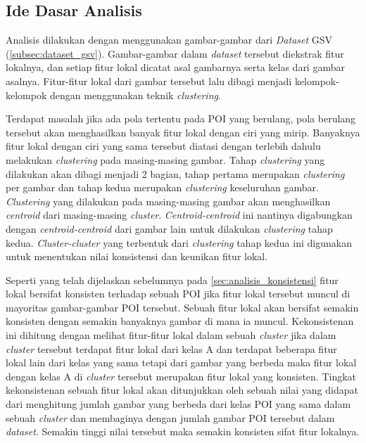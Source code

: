 \subsection{Ide Dasar Analisis}
\label{subsec:ide_analisis_clustering}
Analisis dilakukan dengan menggunakan gambar-gambar dari \textit{Dataset} GSV (\ref{subsec:dataset_gsv}). Gambar-gambar dalam \textit{dataset} tersebut diekstrak fitur lokalnya, dan setiap fitur lokal dicatat asal gambarnya serta kelas dari gambar asalnya. Fitur-fitur lokal dari gambar tersebut lalu dibagi menjadi kelompok-kelompok dengan menggunakan teknik \textit{clustering}.

 Terdapat masalah jika ada pola tertentu pada POI yang berulang, pola berulang tersebut akan menghasilkan banyak fitur lokal dengan ciri yang mirip. Banyaknya fitur lokal dengan ciri yang sama tersebut diatasi dengan terlebih dahulu melakukan \textit{clustering} pada masing-masing gambar. Tahap \textit{clustering} yang dilakukan akan dibagi menjadi 2 bagian, tahap pertama merupakan \textit{clustering} per gambar dan tahap kedua merupakan \textit{clustering} keseluruhan gambar. \textit{Clustering} yang dilakukan pada masing-masing gambar akan menghasilkan \textit{centroid} dari masing-masing \textit{cluster}. \textit{Centroid-centroid} ini nantinya digabungkan dengan \textit{centroid-centroid} dari gambar lain untuk dilakukan \textit{clustering} tahap kedua. \textit{Cluster-cluster} yang terbentuk dari \textit{clustering} tahap kedua ini digunakan untuk menentukan nilai konsistensi dan keunikan fitur lokal. 

Seperti yang telah dijelaskan sebelumnya pada \ref{sec:analisis_konsistensi} fitur lokal bersifat konsisten terhadap sebuah POI jika fitur lokal tersebut muncul di mayoritas gambar-gambar POI tersebut. Sebuah fitur lokal akan bersifat semakin konsisten dengan semakin banyaknya gambar di mana ia muncul. Kekonsistenan ini dihitung dengan melihat fitur-fitur lokal dalam sebuah \textit{cluster} jika dalam \textit{cluster} tersebut terdapat fitur lokal dari kelas A dan terdapat beberapa fitur lokal lain dari kelas yang sama tetapi dari gambar yang berbeda maka fitur lokal dengan kelas A di \textit{cluster} tersebut merupakan fitur lokal yang konsisten. Tingkat kekonsistenan sebuah fitur lokal akan ditunjukkan oleh sebuah nilai yang didapat dari menghitung jumlah gambar yang berbeda dari kelas POI yang sama dalam sebuah \textit{cluster} dan membaginya dengan jumlah gambar POI tersebut dalam \textit{dataset}. Semakin tinggi nilai tersebut maka semakin konsisten sifat fitur lokalnya.

